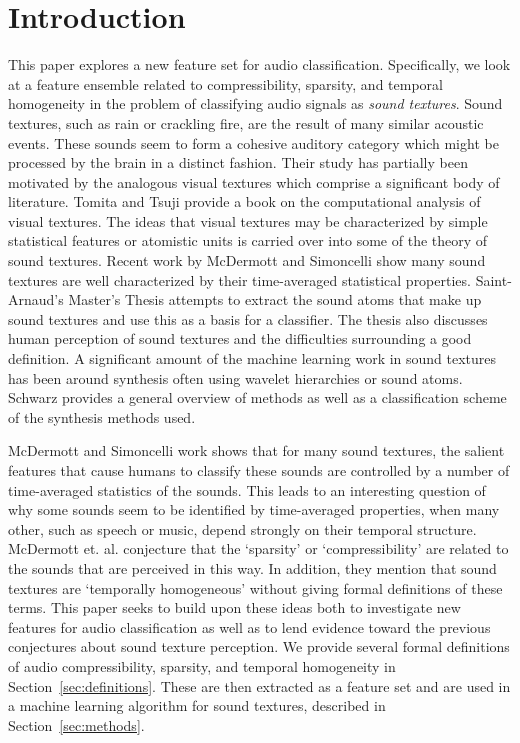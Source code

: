 \documentclass{sig-alternate-05-2015}
\begin{document}
\section{Introduction} 
This paper explores a new feature set for audio classification. Specifically, we look at a feature ensemble related to compressibility, sparsity, and temporal homogeneity in the problem of classifying audio signals as \emph{sound textures}. Sound textures, such as rain or crackling fire, are the result of many similar acoustic events. These sounds seem to form a cohesive auditory category which might be processed by the brain in a distinct fashion\cite{mcdermott2013summary, McDermott2011926}. Their study has partially been motivated by the analogous visual textures which comprise a significant body of literature. Tomita and Tsuji provide a book on the computational analysis of visual textures\cite{tomita2013computer}. The ideas that visual textures may be characterized by simple statistical features\cite{julesz1962visual} or atomistic units\cite{julesz1981textons} is carried over into some of the theory of sound textures. Recent work by McDermott and Simoncelli show many sound textures are well characterized by their time-averaged statistical properties\cite{McDermott2011926, mcdermott2013summary}. Saint-Arnaud's Master's Thesis attempts to extract the sound atoms that make up sound textures and use this as a basis for a classifier\cite{saint1995classification}. The thesis also discusses human perception of sound textures and the difficulties surrounding a good definition. A significant amount of the machine learning work in sound textures has been around synthesis often using wavelet hierarchies\cite{kersten2010sound} or sound atoms\cite{saint1995analysis}. Schwarz provides a general overview of methods as well as a classification scheme of the synthesis methods used\cite{schwarz2011state}.

McDermott and Simoncelli work shows that for many sound textures, the salient features that cause humans to classify these sounds are controlled by a number of time-averaged statistics of the sounds\cite{McDermott2011926, mcdermott2013summary}. This leads to an interesting question of why some sounds seem to be identified by time-averaged properties, when many other, such as speech or music, depend strongly on their temporal structure. McDermott et. al. conjecture that the `sparsity' or `compressibility' are related to the sounds that are perceived in this way. In addition, they mention that sound textures are `temporally homogeneous' without giving formal definitions of these terms. This paper seeks to build upon these ideas both to investigate new features for audio classification as well as to lend evidence toward the previous conjectures about sound texture perception. We provide several formal definitions of audio compressibility, sparsity, and temporal homogeneity in Section~\ref{sec:definitions}. These are then extracted as a feature set and are used in a machine learning algorithm for sound textures, described in Section~\ref{sec:methods}.
\end{document}
